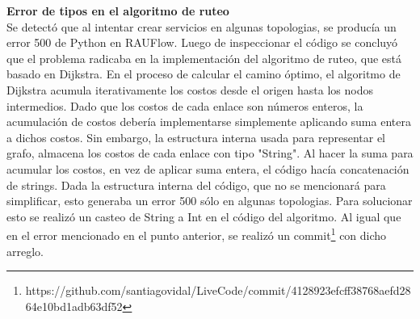 \textbf{Error de tipos en el algoritmo de ruteo} \\
Se detectó que al intentar crear servicios en algunas topologias, se producía un error 500 de Python en RAUFlow. Luego de inspeccionar el código se concluyó que el problema radicaba en la implementación del algoritmo de ruteo, que está basado en Dijkstra. En el proceso de calcular el camino óptimo, el algoritmo de Dijkstra acumula iterativamente los costos desde el origen hasta los nodos intermedios. Dado que los costos de cada enlace son números enteros, la acumulación de costos debería implementarse simplemente aplicando suma entera a dichos costos. Sin embargo, la estructura interna usada para representar el grafo, almacena los costos de cada enlace con tipo "String". Al hacer la suma para acumular los costos, en vez de aplicar suma entera, el código hacía concatenación de strings. Dada la estructura interna del código, que no se mencionará para simplificar, esto generaba un error 500 sólo en algunas topologias. Para solucionar esto se realizó un casteo de String a Int en el código del algoritmo. Al igual que en el error mencionado en el punto anterior, se realizó un commit\footnote{https://github.com/santiagovidal/LiveCode/commit/4128923efcff38768aefd2864e10bd1adb63df52} con dicho arreglo.

